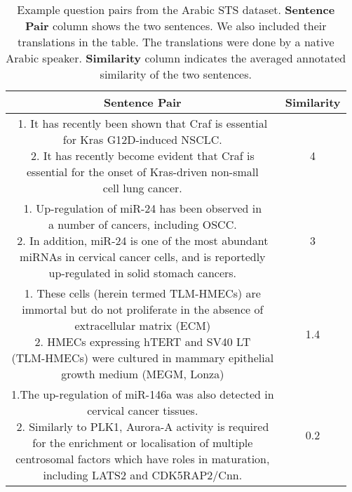 \begin{enumerate}
	\begin{table}[ht!]
		\centering
			\begin{tabular}{c|c}
				\hline
				\multicolumn{1}{c|}{\textbf{Sentence Pair}} & 
				\multicolumn{1}{c}{\textbf{Similarity}}  \\
				\hline
				\makecell[l]{1. It has recently been shown that Craf is essential \\ for Kras G12D-induced NSCLC. \\ 
					2. It has recently become evident that Craf is \\ essential for the onset of Kras-driven non-small \\ cell lung cancer.} & 4  \\
				\hline
				\makecell[l]{1. Up-regulation of miR-24 has been observed in \\ a number of cancers, including OSCC. \\ 
					2. In addition, miR-24 is one of the most abundant \\ miRNAs in cervical cancer cells, and is reportedly \\ up-regulated in solid stomach cancers. } & 3 \\
				\hline
				\makecell[l]{1. These cells (herein termed TLM-HMECs) are \\ immortal but do not proliferate in the absence of \\ extracellular matrix (ECM) \\  
					2. HMECs expressing hTERT and SV40 LT \\ (TLM-HMECs) were cultured in mammary epithelial \\ growth medium (MEGM, Lonza)  } & 1.4  \\
				\hline
				\makecell[l]{1.The up-regulation of miR-146a was also detected in \\ cervical cancer tissues.  \\ 
					2. Similarly to PLK1, Aurora-A activity is required \\ for the enrichment or localisation of multiple \\ centrosomal  factors which have roles in maturation, \\ including LATS2 and CDK5RAP2/Cnn.} & 0.2  \\
				\hline               
			\end{tabular}
		\caption[Example question pairs from the Arabic STS dataset]{Example question  pairs from the Arabic STS dataset. \textbf{Sentence Pair} column shows the two sentences. We also included their translations in the table. The translations were done by a native Arabic speaker. \textbf{Similarity} column indicates the averaged annotated similarity of the two sentences.}
		\label{tab:biomeddata}
	\end{table} 
	

\end{enumerate}
